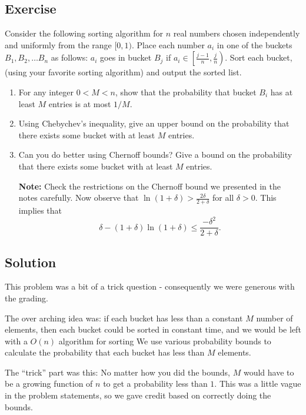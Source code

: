 \documentclass{article}
\newcounter{counter}
\newcommand{\Exercise}{Exercise \stepcounter{counter}\thecounter}
\begin{document}
\subsection*{\Exercise}{
    Consider the following sorting algorithm for $n$ real numbers chosen independently and uniformly from the range $[0,1)$. Place each number $a_i$ in one of the buckets $B_1, B_2, \ldots B_n$ as follows: $a_i$ goes in bucket $B_j$ if $a_i \in \left[\frac{j-1}{n},\frac{j}{n}\right)$. Sort each bucket, (using your favorite sorting algorithm) and output the sorted list.
    \begin{enumerate}
        \item For any integer $0 < M < n$, show that the probability that bucket $B_i$ has at least $M$ entries is at most $1/M$.
        \item Using Chebychev's inequality, give an upper bound on the probability that there exists some bucket with at least $M$ entries.
        \item Can you do better using Chernoff bounds? Give a bound on the probability that there exists some bucket with at least $M$ entries.

        \vspace{3mm}
        \textbf{Note:} Check the restrictions on the Chernoff bound we presented in the notes carefully. Now observe that $\ln(1 + \delta) > \frac{2\delta}{2 + \delta} $ for all \underline{$\delta > 0$}. This implies that $$\delta - (1 + \delta) \ln(1 + \delta) \le \frac{-\delta^{2}}{2 + \delta}.$$
    \end{enumerate}
    
\subsection*{Solution}
    This problem was a bit of a trick question - consequently we were generous
    with the grading.

    \vspace{2mm}
    The over arching idea was: if each bucket has less than a constant $M$ number of elements, then each bucket could be sorted in constant time, and
    we would be left with a $O(n)$ algorithm for sorting We use various probability bounds to calculate the probability that each bucket has less
    than $M$ elements.

    \vspace{2mm}
     The ``trick'' part was this: No matter how you did the bounds, $M$ would have to be a growing function of $n$ to get a probability less than $1$. This was a little vague in the problem statements, so we gave credit based on correctly doing the bounds.

}
\end{document}
